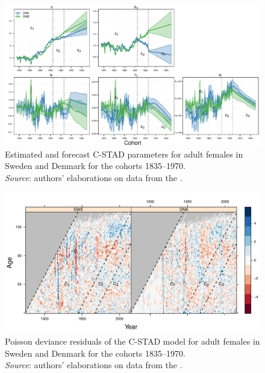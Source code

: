 \documentclass[11pt, a4paper]{article}
\begin{document}
\begin{landscape}
	\begin{figure}[h!]
		\begin{center}
			\includegraphics[scale=0.92]{./Figures/FA1.pdf} 
			\caption{Estimated and forecast C-STAD parameters for adult females in Sweden and Denmark for the cohorts 1835--1970. \\ \small \textit{Source}: authors' elaborations on data from the \cite{HMD}.\label{Fig:CSTADparams}}    
		\end{center}
	\end{figure}
\end{landscape}
 
\begin{landscape}
	\begin{figure}[h!]
		\begin{center}
			\includegraphics[scale=0.92]{./Figures/FA2.pdf} 
			\caption{Poisson deviance residuals of the C-STAD model for adult females in Sweden and Denmark for the cohorts 1835--1970.\\ \small \textit{Source}: authors' elaborations on data from the \cite{HMD}.\label{Fig:CSTADresid}}    
		\end{center}
	\end{figure}
\end{landscape}


 
\end{document}

